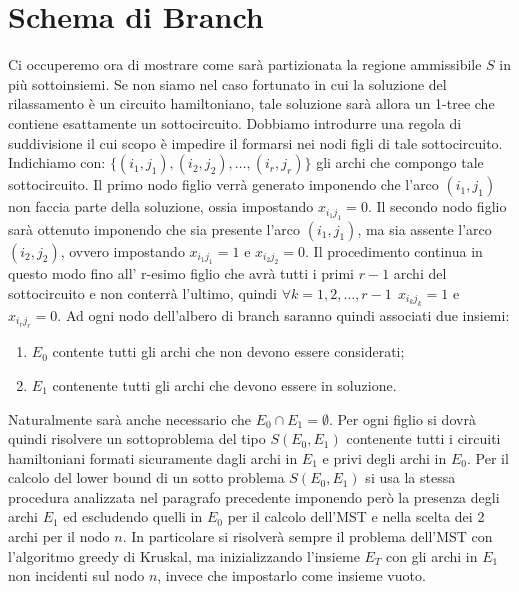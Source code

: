 \documentclass[
    article,            %
    12pt,                %
    oneside,            %
    a4paper,            %
    english,            %
    italian,                %
    sumario=tradicional,
]{abntex2}
\begin{document}
    \section{Schema di Branch}\label{sec:schema-di-branch}
    Ci occuperemo ora di mostrare come sarà partizionata la regione ammissibile $S$ in più sottoinsiemi.
    Se non siamo nel caso fortunato in cui la soluzione del rilassamento è un circuito hamiltoniano, tale soluzione sarà allora un 1-tree che contiene esattamente un sottocircuito.
    Dobbiamo introdurre una regola di suddivisione il cui scopo è impedire il formarsi nei nodi figli di tale sottocircuito.
    Indichiamo con: $\{(i_1, j_1), (i_2,j_2),\ldots ,(i_r,j_r)\}$ gli archi che compongo tale sottocircuito.
    Il primo nodo figlio verrà generato imponendo che l'arco $(i_1,j_1)$ non faccia parte della soluzione, ossia impostando $x_{i_{1}j_{1}} = 0$.
    Il secondo nodo figlio sarà ottenuto imponendo che sia presente l'arco $(i_1,j_1)$, ma sia assente l'arco $(i_2,j_2)$, ovvero impostando $x_{i_{1}j_{1}} = 1$ e $x_{i_{2}j_{2}} = 0$.
    Il procedimento continua in questo modo fino all' r-esimo figlio che avrà tutti i primi $r-1$ archi del sottocircuito e non conterrà l'ultimo, quindi $\forall k = 1,2,\dots,r-1 \:\:x_{i_{k}j_{k}} = 1$ e $x_{i_{r}j_{r}} = 0$.
    \newline
    Ad ogni nodo dell'albero di branch saranno quindi associati due insiemi:
    \begin{enumerate}
        \item $E_0$ contente tutti gli archi che non devono essere considerati;
        \item $E_1$ contenente tutti gli archi che devono essere in soluzione.
    \end{enumerate}
    Naturalmente sarà anche necessario che $E_0 \cap E_1 = \emptyset$.
    \newline
    Per ogni figlio si dovrà quindi risolvere un sottoproblema del tipo $S(E_0, E_1)$ contenente tutti i circuiti hamiltoniani formati sicuramente dagli archi in $E_1$ e privi degli archi in $E_0$.
    Per il calcolo del lower bound di un sotto problema $S(E_0, E_1)$ si usa la stessa procedura analizzata nel paragrafo precedente imponendo però la presenza degli archi $E_1$ ed escludendo quelli in $E_0$ per il calcolo dell'MST e nella scelta dei 2 archi per il nodo $n$.
    In particolare si risolverà sempre il problema dell'MST con l'algoritmo greedy di Kruskal, ma inizializzando l'insieme $E_T$ con gli archi in $E_1$ non incidenti sul nodo $n$, invece che impostarlo come insieme vuoto.
\end{document}
